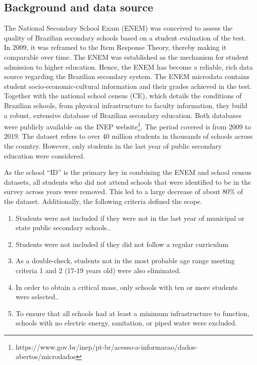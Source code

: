 \subsection{Background and data source}

The National Secondary School Exam (ENEM) was conceived to assess the quality of Brazilian secondary schools based on a student evaluation of the test. In 2009, it was reframed to the Item Response Theory, thereby making it comparable over time. The ENEM was established as the mechanism for student admission to higher education. Hence, the ENEM has become a reliable, rich data source regarding the Brazilian secondary system. The ENEM microdata contains student socio-economic-cultural information and their grades achieved in the test. Together with the national school census (CE), which details the conditions of Brazilian schools, from physical infrastructure to faculty information, they build a robust, extensive database of Brazilian secondary education. Both databases were publicly available on the INEP website\footnote{  https://www.gov.br/inep/pt-br/acesso-a-informacao/dados-abertos/microdados}. The period covered is from 2009 to 2019. The dataset refers to over 40 million students in thousands of schools across the country. However, only students in the last year of public secondary education were considered. 

As the school “ID” is the primary key in combining the ENEM and school census datasets, all students who did not attend schools that were identified to be in the survey across years were removed. This led to a large decrease of about 80\% of the dataset. Additionally, the following criteria defined the scope.

\begin{enumerate}
\item Students were not included if they were not in the last year of municipal or state public secondary schools..
\item Students were not included if they did not follow a regular curriculum
\item As a double-check, students not in the most probable age range meeting criteria 1 and 2 (17-19 years old) were also eliminated.
\item In order to obtain a critical mass, only schools with ten or more students were selected..
\item To ensure that all schools had at least a minimum infrastructure to function, schools with no electric energy, sanitation, or piped water were excluded.
\end{enumerate}




